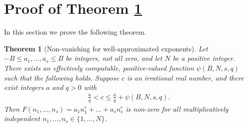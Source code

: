 \documentclass[9pt]{amsart}
\theoremstyle{my_theorem_style}
\numberwithin{definition}{section}
\newtheorem{theorem}[definition]{Theorem}
\begin{document}
\section{Proof of Theorem \ref{lower_bound_on_linear_form_in_irrational_powers}}
\label{proof_of_theorem_C}

In this section we prove the following theorem.

\begin{theorem}
[Non-vanishing for well-approximated exponents]
\label{lower_bound_on_linear_form_in_irrational_powers}
    Let $-B \leq a_1, \dots, a_s \leq B$ be integers, not all zero, and let $N$ be a positive integer. There exists an effectively computable, positive-valued function $\psi(B, N, s, q)$ such that the following holds. Suppose $c$ is an irrational real number, and there exist integers $a$ and $q > 0$ with
    \begin{align}
    \label{Diophantine_approximation_condition_proof}
        \frac{a}{q} < c \leq \frac{a}{q} + \psi(B, N, s, q).
    \end{align}
    Then $F(n_1, \dots, n_s) = a_1 n_1^c + \dots + a_s n_s^c$ is non-zero for all multiplicatively independent $n_1, \dots, n_s \in \{1, \dots, N\}$.
\end{theorem}
\end{document}
